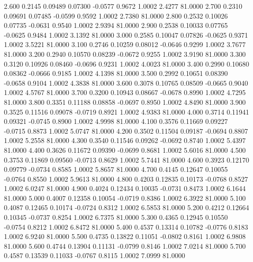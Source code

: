    2.600   0.2145   0.09489   0.07300  -0.0577   0.9672   1.0002   2.4277  81.0000
   2.700   0.2310   0.09691   0.07485  -0.0599   0.9592   1.0002   2.7380  81.0000
   2.800   0.2532   0.10026   0.07735  -0.0631   0.9540   1.0002   2.9394  81.0000
   2.900   0.2538   0.10033   0.07765  -0.0625   0.9484   1.0002   3.1392  81.0000
   3.000   0.2585   0.10047   0.07826  -0.0625   0.9371   1.0002   3.5221  81.0000
   3.100   0.2746   0.10259   0.08012  -0.0646   0.9299   1.0002   3.7677  81.0000
   3.200   0.2940   0.10570   0.08239  -0.0672   0.9255   1.0002   3.9190  81.0000
   3.300   0.3120   0.10926   0.08460  -0.0696   0.9231   1.0002   4.0023  81.0000
   3.400   0.2990   0.10680   0.08362  -0.0666   0.9185   1.0002   4.1398  81.0000
   3.500   0.2992   0.10651   0.08390  -0.0658   0.9104   1.0002   4.3838  81.0000
   3.600   0.3078   0.10765   0.08509  -0.0665   0.9040   1.0002   4.5767  81.0000
   3.700   0.3200   0.10943   0.08667  -0.0678   0.8990   1.0002   4.7295  81.0000
   3.800   0.3351   0.11188   0.08858  -0.0697   0.8950   1.0002   4.8490  81.0000
   3.900   0.3525   0.11516   0.09078  -0.0719   0.8921   1.0002   4.9383  81.0000
   4.000   0.3714   0.11941   0.09321  -0.0745   0.8900   1.0002   4.9998  81.0000
   4.100   0.3576   0.11669   0.09227  -0.0715   0.8873   1.0002   5.0747  81.0000
   4.200   0.3502   0.11504   0.09187  -0.0694   0.8807   1.0002   5.2558  81.0000
   4.300   0.3540   0.11546   0.09262  -0.0692   0.8740   1.0002   5.4397  81.0000
   4.400   0.3626   0.11672   0.09390  -0.0699   0.8681   1.0002   5.6016  81.0000
   4.500   0.3753   0.11869   0.09560  -0.0713   0.8629   1.0002   5.7441  81.0000
   4.600   0.3923   0.12170   0.09779  -0.0734   0.8585   1.0002   5.8657  81.0000
   4.700   0.4145   0.12647   0.10055  -0.0764   0.8550   1.0002   5.9613  81.0000
   4.800   0.4203   0.12835   0.10173  -0.0768   0.8527   1.0002   6.0247  81.0000
   4.900   0.4024   0.12434   0.10035  -0.0731   0.8473   1.0002   6.1644  81.0000
   5.000   0.4007   0.12358   0.10054  -0.0719   0.8386   1.0002   6.3922  81.0000
   5.100   0.4087   0.12465   0.10174  -0.0724   0.8312   1.0002   6.5853  81.0000
   5.200   0.4212   0.12664   0.10345  -0.0737   0.8254   1.0002   6.7375  81.0000
   5.300   0.4365   0.12945   0.10550  -0.0754   0.8212   1.0002   6.8472  81.0000
   5.400   0.4537   0.13314   0.10782  -0.0776   0.8183   1.0002   6.9240  81.0000
   5.500   0.4735   0.13822   0.11051  -0.0802   0.8161   1.0002   6.9808  81.0000
   5.600   0.4744   0.13904   0.11131  -0.0799   0.8146   1.0002   7.0214  81.0000
   5.700   0.4587   0.13539   0.11033  -0.0767   0.8115   1.0002   7.0999  81.0000
